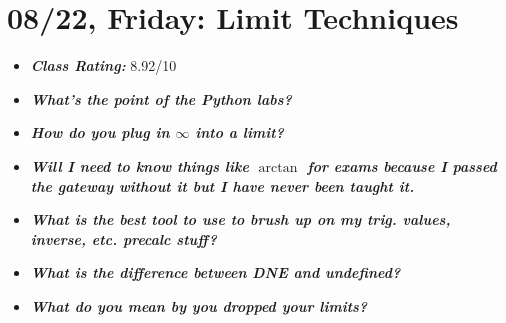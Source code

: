 \documentclass[11pt,letterpaper]{article}
\begin{document}
\newpage
\section*{08/22, Friday: Limit Techniques\label{08-22}}

\begin{itemize}
\item {\bfseries\itshape Class Rating:} 8.92/10
\item {\bfseries\itshape What's the point of the Python labs?}
\item {\bfseries\itshape How do you plug in $\infty$ into a limit?}
\item {\bfseries\itshape Will I need to know things like $\arctan$ for exams because I passed the gateway without it but I have never been taught it.}
\item {\bfseries\itshape What is the best tool to use to brush up on my trig. values, inverse, etc. precalc stuff?}
\item {\bfseries\itshape What is the difference between DNE and undefined?} 
\item {\bfseries\itshape What do you mean by you dropped your limits?} 


\end{itemize}
\end{document}
